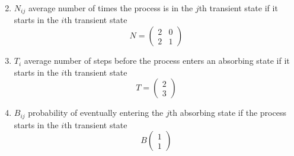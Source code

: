 \documentclass[aspectratio=43]{beamer}
\begin{document}
\begin{frame}
\begin{enumerate}
\setcounter{enumi}{1}
\item $N_{ij}$ average number of times the process is in the $j$th transient state if it starts in the $i$th transient state
\[
N=
\begin{pmatrix}
2 & 0 \\
2 & 1
\end{pmatrix}
\]
\vfill
\item $T_i$ average number of steps before the process enters an absorbing state if it starts in the $i$th transient state
\[
T=\begin{pmatrix}
2\\
3
\end{pmatrix}
\]
\vfill
\item $B_{ij}$ probability of eventually entering the $j$th absorbing state if the process starts in the $i$th transient state
\[
B
\begin{pmatrix}
1\\ 1
\end{pmatrix}
\]
\end{enumerate}
\vfill
\end{frame}
\end{document}
